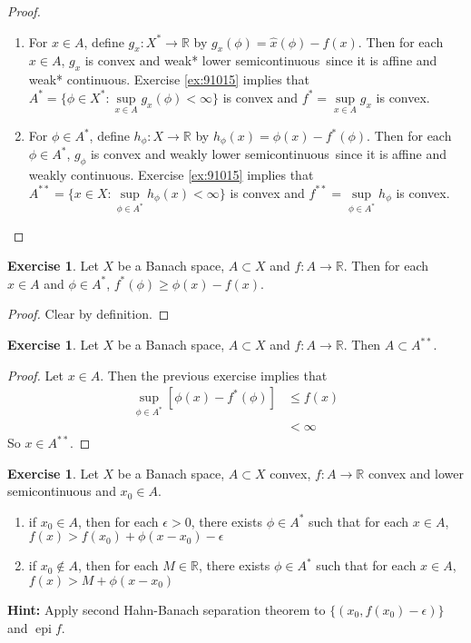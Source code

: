 \documentclass[12pt]{amsart}
\theoremstyle{definition}
\newtheorem{ex}[definition]{Exercise}
\newcommand{\ep}{\epsilon}
\newcommand{\R}{\mathbb{R}}
\newcommand{\lsc}{lower semicontinuous}
\DeclareMathOperator{\epi}{epi}
\newcommand{\lex}[1]{\label{ex:#1}}
\newcommand{\rex}[1]{Exercise \ref{ex:#1}}
\begin{document}
	\begin{proof} \
		\begin{enumerate}
			\item For $x \in A$, define $g_x: X^* \rightarrow \R$ by $g_x(\phi) = \hat{x}(\phi) - f(x)$. Then for each $x \in A$, $g_x$ is convex and weak* \lsc \, since it is affine and weak* continuous. \rex{91015} implies that $A^* = \{\phi \in X^*: \sup\limits_{x \in A} g_x(\phi) < \infty \}$ is convex and  $f^* = \sup\limits_{x \in A} g_x$ is convex.
			\item For $\phi \in A^*$, define $h_{\phi}: X \rightarrow \R$ by $h_{\phi}(x) = \phi(x) - f^{*}(\phi)$. Then for each $\phi \in A^*$, $g_{\phi}$ is convex and weakly \lsc \, since it is affine and weakly continuous. \rex{91015} implies that $A^{**} = \{x \in X: \sup\limits_{\phi \in A^*} h_{\phi}(x) < \infty \}$ is convex and   $f^{**} = \sup\limits_{\phi \in A^*} h_{\phi}$ is convex. 
		\end{enumerate}		 
	\end{proof}
	
	\begin{ex} \lex{}
		Let $X$ be a Banach space, $A \subset X$ and $f:A \rightarrow \R$. Then for each $x \in A$ and $\phi \in A^*$, $f^*(\phi) \geq \phi(x) - f(x)$.	
	\end{ex}
	
	\begin{proof}
	Clear by definition.
	\end{proof}
	
	\begin{ex} \lex{}
	Let $X$ be a Banach space, $A \subset X$ and $f:A \rightarrow \R$. Then $A \subset A^{**}$.
	\end{ex}

	\begin{proof}
		Let $x \in A$. Then the previous exercise implies that
		\begin{align*}
			\sup_{\phi \in A^*} [\phi(x) - f^{*}(\phi)] 
			& \leq f(x) \\
			& < \infty  
		\end{align*}
		So $x \in A^{**}$.
	\end{proof}

	\begin{ex}
		Let $X$ be a Banach space, $A \subset X$ convex, $f:A \rightarrow \R$ convex and lower semicontinuous and $x_0 \in A$. 
		\begin{enumerate}
			\item if $x_0 \in A$, then for each $\ep >0$, there exists $\phi \in A^*$ such that for each $x \in A$, $f(x) > f(x_0) + \phi(x - x_0) - \ep$
			\item if $x_0 \not \in A$, then for each $M \in \R$, there exists $\phi \in A^*$ such that for each $x \in A$, $f(x) > M + \phi(x - x_0)$
		\end{enumerate}
	\textbf{Hint:} Apply second Hahn-Banach separation theorem to $\{(x_0, f(x_0) - \ep)\}$ and $\epi f$.
	\end{ex}
\end{document}
